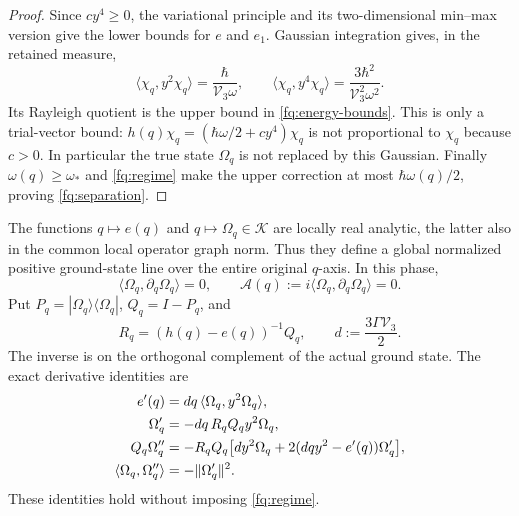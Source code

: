 \begin{proof}
Since $cy^4\geq0$, the variational principle and its two-dimensional
min--max version give the lower bounds for $e$ and $e_1$.
Gaussian integration gives, in the retained measure,
\[
 \langle\chi_q,y^2\chi_q\rangle=\frac{\hbar}{\mathcal V_3\omega},
 \qquad
 \langle\chi_q,y^4\chi_q\rangle
       =\frac{3\hbar^2}{\mathcal V_3^2\omega^2}.
\]
Its Rayleigh quotient is the upper bound in
\eqref{fq:energy-bounds}. This is only a trial-vector bound:
$h(q)\chi_q=(\hbar\omega/2+cy^4)\chi_q$ is not proportional
to $\chi_q$ because $c>0$. In particular the true state
$\Omega_q$ is not replaced by this Gaussian.
Finally $\omega(q)\geq\omega_*$ and \eqref{fq:regime} make the
upper correction at most $\hbar\omega(q)/2$, proving
\eqref{fq:separation}.
\end{proof}

\begin{lemma}
\label{fq:bundle}
The functions $q\mapsto e(q)$ and $q\mapsto\Omega_q\in\mathscr K$
are locally real analytic, the latter also in the common local
operator graph norm. Thus they define a global normalized positive
ground-state line over the entire original $q$-axis. In this phase,
\[
 \langle\Omega_q,\partial_q\Omega_q\rangle=0,
 \qquad \mathcal A(q):=i\langle\Omega_q,\partial_q\Omega_q\rangle=0.
\]
Put $P_q=|\Omega_q\rangle\langle\Omega_q|$, $Q_q=I-P_q$, and
\[
 R_q=(h(q)-e(q))^{-1}Q_q,\qquad
 d:=\frac{3\Gamma\mathcal V_3}{2}.
\]
The inverse is on the orthogonal complement of the actual ground
state. The exact derivative identities are
\begin{align}
 e'(q)&=dq\,\langle\Omega_q,y^2\Omega_q\rangle,\notag\\
 \Omega'_q&=-dq\,R_qQ_qy^2\Omega_q,\label{fq:first-derivative}\\
 Q_q\Omega''_q
 &=-R_qQ_q\bigl[d y^2\Omega_q
                     +2(dq y^2-e'(q))\Omega'_q\bigr],\notag\\
 \langle\Omega_q,\Omega''_q\rangle&=-\|\Omega'_q\|^2.\notag
\end{align}
These identities hold without imposing \eqref{fq:regime}.
\end{lemma}
